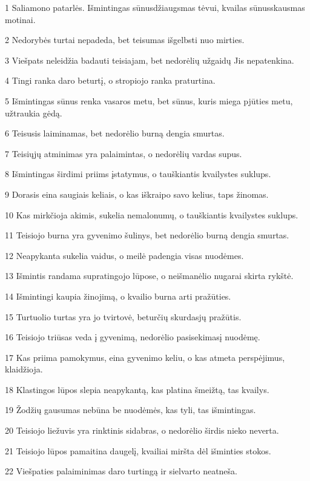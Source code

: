 \par 1 Saliamono patarlės. Išmintingas sūnus­džiaugsmas tėvui, kvailas sūnus­skausmas motinai. 
\par 2 Nedorybės turtai nepadeda, bet teisumas išgelbsti nuo mirties. 
\par 3 Viešpats neleidžia badauti teisiajam, bet nedorėlių užgaidų Jis nepatenkina. 
\par 4 Tingi ranka daro beturtį, o stropiojo ranka praturtina. 
\par 5 Išmintingas sūnus renka vasaros metu, bet sūnus, kuris miega pjūties metu, užtraukia gėdą. 
\par 6 Teisusis laiminamas, bet nedorėlio burną dengia smurtas. 
\par 7 Teisiųjų atminimas yra palaimintas, o nedorėlių vardas supus. 
\par 8 Išmintingas širdimi priims įstatymus, o tauškiantis kvailystes suklups. 
\par 9 Dorasis eina saugiais keliais, o kas iškraipo savo kelius, taps žinomas. 
\par 10 Kas mirkčioja akimis, sukelia nemalonumų, o tauškiantis kvailystes suklups. 
\par 11 Teisiojo burna yra gyvenimo šulinys, bet nedorėlio burną dengia smurtas. 
\par 12 Neapykanta sukelia vaidus, o meilė padengia visas nuodėmes. 
\par 13 Išmintis randama supratingojo lūpose, o neišmanėlio nugarai skirta rykštė. 
\par 14 Išmintingi kaupia žinojimą, o kvailio burna arti pražūties. 
\par 15 Turtuolio turtas yra jo tvirtovė, beturčių skurdas­jų pražūtis. 
\par 16 Teisiojo triūsas veda į gyvenimą, nedorėlio pasisekimas­į nuodėmę. 
\par 17 Kas priima pamokymus, eina gyvenimo keliu, o kas atmeta perspėjimus, klaidžioja. 
\par 18 Klastingos lūpos slepia neapykantą, kas platina šmeižtą, tas kvailys. 
\par 19 Žodžių gausumas nebūna be nuodėmės, kas tyli, tas išmintingas. 
\par 20 Teisiojo liežuvis yra rinktinis sidabras, o nedorėlio širdis nieko neverta. 
\par 21 Teisiojo lūpos pamaitina daugelį, kvailiai miršta dėl išminties stokos. 
\par 22 Viešpaties palaiminimas daro turtingą ir sielvarto neatneša. 
